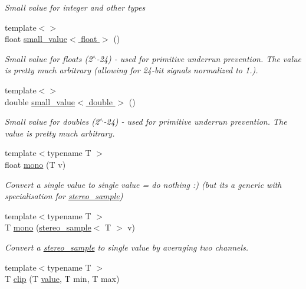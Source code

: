 \begin{DoxyCompactItemize}
\begin{DoxyCompactList}\small\item\em \textquotesingle{}Small value\textquotesingle{} for integer and other types \end{DoxyCompactList}\item 
{\footnotesize template$<$$>$ }\\float \hyperlink{namespacedsp_abb435f02d9ef5d01c20cf2d59b8f9828}{small\+\_\+value$<$ float $>$} ()
\begin{DoxyCompactList}\small\item\em \textquotesingle{}Small value\textquotesingle{} for floats (2$^\wedge$-\/24) -\/ used for primitive underrun prevention. The value is pretty much arbitrary (allowing for 24-\/bit signals normalized to 1.). \end{DoxyCompactList}\item 
{\footnotesize template$<$$>$ }\\double \hyperlink{namespacedsp_abdd544b53c1b6758e9bf79c88fcade0e}{small\+\_\+value$<$ double $>$} ()
\begin{DoxyCompactList}\small\item\em \textquotesingle{}Small value\textquotesingle{} for doubles (2$^\wedge$-\/24) -\/ used for primitive underrun prevention. The value is pretty much arbitrary. \end{DoxyCompactList}\item 
{\footnotesize template$<$typename T $>$ }\\float \hyperlink{namespacedsp_ac291938d1d181b2d1b79c20fd6fc8b88}{mono} (T v)
\begin{DoxyCompactList}\small\item\em Convert a single value to single value = do nothing \+:) (but it\textquotesingle{}s a generic with specialisation for \hyperlink{structdsp_1_1stereo__sample}{stereo\+\_\+sample}) \end{DoxyCompactList}\item 
{\footnotesize template$<$typename T $>$ }\\T \hyperlink{namespacedsp_acdc0c2104656cbd512f644820696a215}{mono} (\hyperlink{structdsp_1_1stereo__sample}{stereo\+\_\+sample}$<$ T $>$ v)
\begin{DoxyCompactList}\small\item\em Convert a \hyperlink{structdsp_1_1stereo__sample}{stereo\+\_\+sample} to single value by averaging two channels. \end{DoxyCompactList}\item 
{\footnotesize template$<$typename T $>$ }\\T \hyperlink{namespacedsp_ad310e31e6431e2004822d08b40ee5111}{clip} (T \hyperlink{tk_8h_a177a0765f574ef6642002696d9cd82d0}{value}, T min, T max)

\end{DoxyCompactItemize}
